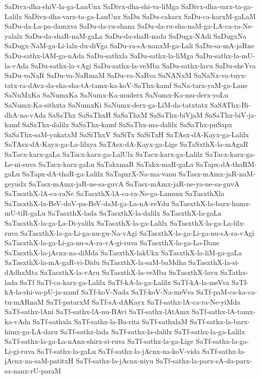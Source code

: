 {SaDivx-dha-shiV-la-ga-LanUnx
SaDivx-dha-shi-va-liMga
SaDivx-dha-varx-ta-ga-Lalilx
SaDivx-dha-varx-ta-ga-LanUnx
SaDu
SaDu-cakarx
SaDu-ca-karxM-gaLaM
SaDu-da-La-pa-damxva
SaDu-da-ru-shana
SaDu-da-ru-sha-naM-ga-LA-ca-ra-Ne-yalalx
SaDu-da-shaR-naM-gaLa
SaDu-da-shaR-nada
SaDugx-NAdi
SaDugxNa
SaDugx-NaM-ga-Li-lalx-du-diVga
SaDu-ra-sA-nanxM-ga-Lali
SaDu-sa-mA-jaRne
SaDu-sathx-lAM-ga-nAda
SaDu-sathxla
SaDu-sathx-la-liMga
SaDu-sathx-la-mU-la-vAda
SaDu-sathx-la-vAgi
SaDu-sathx-la-veMba
SaDu-sathx-lavu
SaDu-sheYva
SaDu-vaNaR
SaDu-va-NaRmaM
SaDu-va-NaRva
SaNANxM
SaNaNx-va-tuyx-tatx-ra-dAvx-da-sha-sha-tA-tamx-ka-koV-SaThx-kamf
SaNa-tarx-yaM-ga-Lane
SaNuMxKa
SaNumxKa
SaNumx-Ka-muderx
SaNumx-Ka-mu-derx-yoLu
SaNumx-Ka-sithxta
SaNumxKi
SaNumx-derx-ga-LiM-da-tatxtatx
SaSAThx-Bi-dhA-na-vAda
SaSaThx
SaSaThxH
SaSaThxM
SaSaThx-biVjaM
SaSaThx-biV-ja-kamf
SaSaThx-dalilx
SaSaThx-kamf
SaSaThx-ma-dalilx
SaSaThx-puSapx
SaSaThx-saM-yukatxM
SaSiThxV
SaSiTx
SaSiTxH
SaTAsx-dA-Kayx-ga-Lalilx
SaTAsx-dA-Kayx-ga-La-lilxya
SaTAsx-dA-Kayx-ga-Lige
SaTaSxthX-la-mAgaR
SaTacx-karx-gaLa
SaTacx-karx-ga-LalUlx
SaTacx-karx-ga-Lalilx
SaTacx-karx-ga-Le-ni-suva
SaTacx-karx-gaLu
SaTakxmaR
SaTakx-maR-gaLa
SaTapx-dA-thaRM-gaLu
SaTapx-dA-thaR-ga-Lalilx
SaTapxrX-Na-ma-vanu
SaTasx-mAmx-jaR-naM-geyudx
SaTasx-mAmx-jaR-ne-sa-guvA
SaTasx-mAmx-jaR-ne-ya-ne-sa-guvA
SaTasxthX-lA-ca-raNe
SaTasxthX-lA-ca-ra-Ne-ga-Lanunx
SaTasxthXla
SaTasxthX-la-BeV-doV-pa-BeV-daM-ga-La-nA-reYdu
SaTasxthX-la-barx-hamx-mU-tiR-gaLu
SaTasxthX-lada
SaTasxthX-la-dalilx
SaTasxthX-la-gaLa
SaTasxthX-la-ga-La-Di-yalilx
SaTasxthX-la-ga-Lalilx
SaTasxthX-la-ga-La-lilx-ruva
SaTasxthX-la-ga-Li-ga-nu-gu-Na-vAgi
SaTasxthX-la-ga-Li-ga-nu-sA-ra-vAgi
SaTasxthX-la-ga-Li-ga-nu-sA-ra-vA-gi-ruva
SaTasxthX-la-ga-Lo-Dane
SaTasxthX-la-jAcnx-na-diMda
SaTasxthX-lakUkx
SaTasxthX-la-liM-ga-gaLa
SaTasxthX-la-mA-gaR-vi-Didu
SaTasxthX-la-saM-baMdha
SaTasxthX-la-si-dAdhxMta
SaTasxthX-la-vAru
SaTasxthX-la-veMba
SaTasxthX-lavu
SaTathx-lada
SaTf
SaTf-ca-karx-ga-Lalilx
SaTf-kA-la-ga-Lalilx
SaTf-kA-la-meVva
SaTf-kA-la-shi-va-pU-ja-namf
SaTf-koV-Nada
SaTf-koV-Na-meVva
SaTf-paM-ca-ka-ca-tu-mARnaM
SaTf-patarxM
SaTf-sA-dAKayx
SaTf-sathx-lA-ca-ra-Ne-yiMda
SaTf-sathx-lAni
SaTf-sathx-lA-nu-BAvi
SaTf-sathx-lAtAmx
SaTf-sathx-lA-tamx-ka-vAda
SaTf-sathxla
SaTf-sathx-la-Ba-rita
SaTf-sathxlaM
SaTf-sathx-la-barx-himx-ga-LA-daru
SaTf-sathx-lada
SaTf-sathx-la-dalilx
SaTf-sathx-la-ga-Lalilx
SaTf-sathx-la-ga-La-nAnx-shirx-si-ruva
SaTf-sathx-la-ga-Lige
SaTf-sathx-la-ga-Li-gi-ruva
SaTf-sathx-la-gaLu
SaTf-sathx-la-jAcnx-na-koV-vida
SaTf-sathx-la-jAcnx-na-saM-patitxH
SaTf-sathx-la-jAcnx-niyu
SaTf-sathx-la-parx-sA-da-parx-sa-nanx-rU-paraM
}
